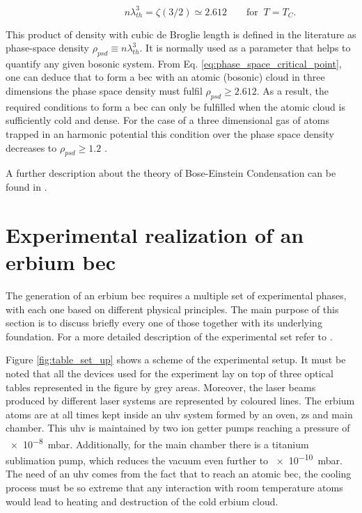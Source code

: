 \begin{equation}\label{eq:phase_space_critical_point}
\qquad\qquad\qquad n \lambda_{th}^3 = \zeta(3/2) \simeq 2.612 \qquad \textrm{for } \ T=T_C.
\end{equation}

This product of density with cubic de Broglie length is defined in the literature as phase-space density $\rho_{psd} \equiv n \lambda_{th}^3$. It is normally used as a parameter that helps to quantify any given bosonic system. From Eq. \eqref{eq:phase_space_critical_point}, one can deduce that to form a \ac{bec} with an atomic (bosonic) cloud in three dimensions the phase space density must fulfil $\rho_{psd} \geq 2.612$. As a result, the required conditions to form a \ac{bec} can only be fulfilled when the atomic cloud is sufficiently cold and dense. For the case of a three dimensional gas of atoms trapped in an harmonic potential this condition over the phase space density decreases to $\rho_{psd} \geq 1.2$ \cite{Pethick2008}. 

A further description about the theory of Bose-Einstein Condensation can be found in \cite{Masahito2010, Pethick2008}.

\section{Experimental realization of an erbium \ac{bec}} \label{sec:experimental_preparation}

The generation of an erbium \ac{bec} requires a multiple set of experimental phases, with each one based on different physical principles. The main purpose of this section is to discuss briefly every one of those together with its underlying foundation. For a more detailed description of the experimental set refer to  \cite{Ulitzsch2016}. 

Figure \ref{fig:table_set_up} shows a scheme of the experimental setup. It must be noted that all the devices used for the experiment lay on top of three optical tables represented in the figure by grey areas. Moreover, the laser beams produced by different laser systems are represented by coloured lines. The erbium atoms are at all times kept inside an \ac{uhv} system formed by an oven, \Ac{zs} and main chamber. This \ac{uhv} is maintained by two ion getter pumps reaching a pressure of \SI{e-8}{\milli\bar}. Additionally, for the main chamber there is a titanium sublimation pump, which reduces the vacuum even further to \SI{e-10}{\milli\bar}. The need of an \ac{uhv} comes from the fact that to reach an atomic \ac{bec}, the cooling process must be so extreme that any interaction with room temperature atoms would lead to heating and destruction of the cold erbium cloud.

